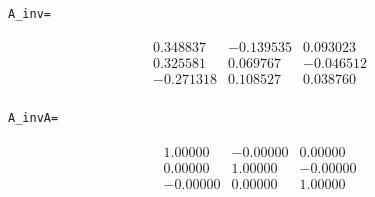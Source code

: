\documentclass{article}
\begin{document}
\begin{CJK}{UTF8}{gbsn}
\paragraph{}
\hspace*{4cm}
\begin{verbatim}
A_inv=
\end{verbatim}
\begin{eqnarray*}
\begin{array}{ccc}
0.348837&-0.139535&0.093023\\
0.325581&0.069767&-0.046512\\
-0.271318&0.108527&0.038760
\end{array}
\end{eqnarray*}
\paragraph{}
\hspace*{4cm}
\begin{verbatim}
A_invA=
\end{verbatim}
\begin{eqnarray*}
\begin{array}{ccc}
1.00000&-0.00000&0.00000\\
0.00000&1.00000&-0.00000\\
-0.00000&0.00000&1.00000
\end{array}
\end{eqnarray*}
\end{CJK}
\end{document}
